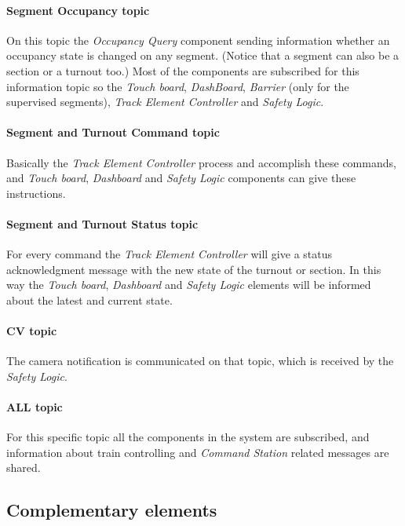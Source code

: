 \paragraph{Segment Occupancy topic}
On this topic the \textit{Occupancy Query} component sending information whether an occupancy state is changed on any segment. (Notice that a segment can also be a section or a turnout too.) Most of the components are subscribed for this information topic so the \textit{Touch board}, \textit{DashBoard}, \textit{Barrier} (only for the supervised segments), \textit{Track Element Controller} and \textit{Safety Logic}.

\paragraph{Segment and Turnout Command topic}\label{par:MQTTTopicCommand}
Basically the \textit{Track Element Controller} process and accomplish these commands, and \textit{Touch board}, \textit{Dashboard} and \textit{Safety Logic} components can give these instructions.

\paragraph{Segment and Turnout Status topic}\label{par:MQTTTopicStatus}
For every command the \textit{Track Element Controller} will give a status acknowledgment message with the new state of the turnout or section. In this way the \textit{Touch board}, \textit{Dashboard} and \textit{Safety Logic} elements will be informed about the latest and current state.

\paragraph{CV topic}
The camera notification is communicated on that topic, which is received by the \textit{Safety Logic}.

\paragraph{ALL topic}
For this specific topic all the components in the system are subscribed, and information about train controlling and \textit{Command Station} related messages are shared.


\subsection{Complementary elements}
